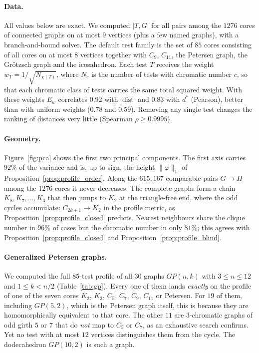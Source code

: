 \documentclass{article}
\begin{document}
\paragraph{Data.}
All values below are exact.  We computed $|T,G|$ for all pairs among the
$1276$ cores of connected graphs on at most $9$ vertices (plus a few named
graphs), with a branch-and-bound solver.  The default test family is the
set of $85$ cores consisting of all cores on at most $8$ vertices together
with $C_9$, $C_{11}$, the Petersen graph, the Gr\"otzsch graph and the
icosahedron.  Each test $T$ receives the weight $w_T=1/\sqrt{N_{\chi(T)}}$,
where $N_c$ is the number of tests with chromatic number $c$, so that each
chromatic class of tests carries the same total squared weight.  With
these weights $E_w$ correlates $0.92$ with $\operatorname{dist}$ and $0.83$
with $d^*$ (Pearson), better than with uniform weights ($0.78$ and $0.59$).
Removing any single test changes the ranking of distances very little
(Spearman $\rho\ge0.9995$).

\paragraph{Geometry.}
Figure~\ref{fig:pca} shows the first two principal components.  The first
axis carries $92\%$ of the variance and is, up to sign, the height
$\|\varphi\|_1$ of Proposition~\ref{prop:profile_order}.  Along the
$615{,}167$ comparable pairs $G\to H$ among the $1276$ cores it never
decreases.  The complete graphs form a chain $K_8,K_7,\dots,K_3$ that then
jumps to $K_2$ at the triangle-free end, where the odd cycles accumulate:
$C_{2k+1}\to K_2$ in the profile metric, as
Proposition~\ref{prop:profile_closed} predicts.  Nearest neighbours share
the clique number in $96\%$ of cases but the chromatic number in only
$81\%$; this agrees with Proposition~\ref{prop:profile_closed} and
Proposition~\ref{prop:profile_blind}.

\paragraph{Generalized Petersen graphs.}
We computed the full $85$-test profile of all $30$ graphs $GP(n,k)$ with
$3\le n\le 12$ and $1\le k<n/2$ (Table~\ref{tab:gp}).  Every one of them
lands \emph{exactly} on the profile of one of the seven cores $K_2$, $K_3$,
$C_5$, $C_7$, $C_9$, $C_{11}$ or Petersen.  For $19$ of them, including
$GP(5,2)$, which is the Petersen graph itself, this is because they are
homomorphically equivalent to that core.  The other $11$ are $3$-chromatic
graphs of odd girth $5$ or $7$ that do \emph{not}
map to $C_5$ or $C_7$, as an exhaustive search confirms.  Yet no test with
at most $12$ vertices distinguishes them from the cycle.  The dodecahedron
$GP(10,2)$ is such a graph.
\end{document}
